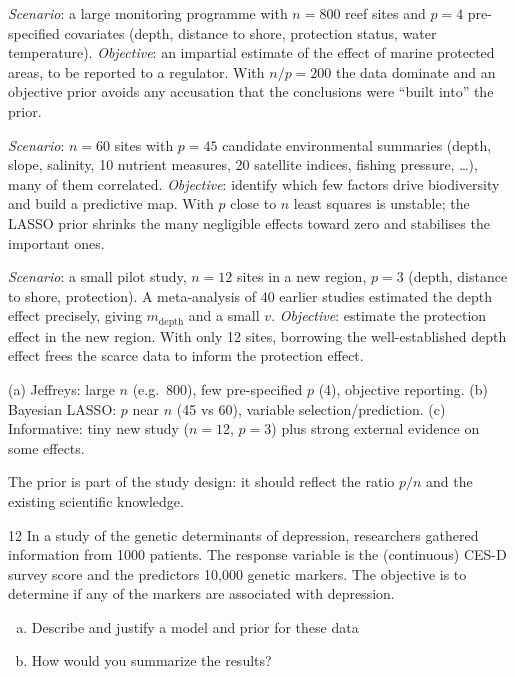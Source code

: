 \documentclass[11pt]{article}
\begin{document}
\solution
{}
\emph{Scenario}: a large monitoring programme with $n=800$ reef sites and $p=4$ pre-specified covariates (depth, distance to shore, protection status, water temperature). \emph{Objective}: an impartial estimate of the effect of marine protected areas, to be reported to a regulator. With $n/p=200$ the data dominate and an objective prior avoids any accusation that the conclusions were ``built into'' the prior.

\emph{Scenario}: $n=60$ sites with $p=45$ candidate environmental summaries (depth, slope, salinity, 10 nutrient measures, 20 satellite indices, fishing pressure, \ldots), many of them correlated. \emph{Objective}: identify which few factors drive biodiversity and build a predictive map. With $p$ close to $n$ least squares is unstable; the LASSO prior shrinks the many negligible effects toward zero and stabilises the important ones.

\emph{Scenario}: a small pilot study, $n=12$ sites in a new region, $p=3$ (depth, distance to shore, protection). A meta-analysis of 40 earlier studies estimated the depth effect precisely, giving $m_{\text{depth}}$ and a small $v$. \emph{Objective}: estimate the protection effect in the new region. With only 12 sites, borrowing the well-established depth effect frees the scarce data to inform the protection effect.

\begin{answer}
(a) Jeffreys: large $n$ (e.g.\ 800), few pre-specified $p$ (4), objective reporting. (b) Bayesian LASSO: $p$ near $n$ (45 vs 60), variable selection/prediction. (c) Informative: tiny new study ($n=12$, $p=3$) plus strong external evidence on some effects.
\end{answer}

\begin{takeaway}
The prior is part of the study design: it should reflect the ratio $p/n$ and the existing scientific knowledge.
\end{takeaway}


\begin{problem}{12}
In a study of the genetic determinants of depression, researchers gathered information from 1000 patients. The response variable is the (continuous) CES-D survey score and the predictors 10,000 genetic markers. The objective is to determine if any of the markers are associated with depression.
\begin{enumerate}[(a)]
\item Describe and justify a model and prior for these data
\item How would you summarize the results?
\end{enumerate}
\end{problem}
\end{document}
